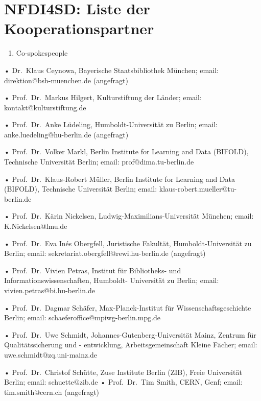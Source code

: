 \documentclass[
]{article}
\author{}
\date{}
\providecommand{\tightlist}{%
  \setlength{\itemsep}{0pt}\setlength{\parskip}{0pt}}
\begin{document}
\hypertarget{nfdi4sd-liste-der-kooperationspartner}{%
\section{NFDI4SD: Liste der
Kooperationspartner}\label{nfdi4sd-liste-der-kooperationspartner}}

\def\labelenumi{\arabic{enumi}.}
\tightlist
\begin{enumerate}
\def\labelenumi{\arabic{enumi}.}
\setcounter{enumi}{1}
\tightlist
\item
  Co-spokespeople
\end{enumerate}

• Dr.~Klaus Ceynowa, Bayerische Staatsbibliothek München; email:
direktion@bsb-muenchen.de (angefragt)

• Prof.~Dr.~Markus Hilgert, Kulturstiftung der Länder; email:
kontakt@kulturstiftung.de

• Prof.~Dr.~Anke Lüdeling, Humboldt-Universität zu Berlin; email:
anke.luedeling@hu-berlin.de (angefragt)

• Prof.~Dr.~Volker Markl, Berlin Institute for Learning and Data
(BIFOLD), Technische Universität Berlin; email: prof@dima.tu-berlin.de

• Prof.~Dr.~Klaus-Robert Müller, Berlin Institute for Learning and Data
(BIFOLD), Technische Universität Berlin; email:
klaus-robert.mueller@tu-berlin.de

• Prof.~Dr.~Kärin Nickelsen, Ludwig-Maximilians-Universität München;
email: K.Nickelsen@lmu.de

• Prof.~Dr.~Eva Inés Obergfell, Juristische Fakultät,
Humboldt-Universität zu Berlin; email:
sekretariat.obergfell@rewi.hu-berlin.de (angefragt)

• Prof.~Dr.~Vivien Petras, Institut für Bibliotheks- und
Informationswissenschaften, Humboldt- Universität zu Berlin; email:
vivien.petras@bi.hu-berlin.de

• Prof.~Dr.~Dagmar Schäfer, Max-Planck-Institut für
Wissenschaftsgeschichte Berlin; email:
schaeferoffice@mpiwg-berlin.mpg.de

• Prof.~Dr.~Uwe Schmidt, Johannes-Gutenberg-Universität Mainz, Zentrum
für Qualitätssicherung und - entwicklung, Arbeitsgemeinschaft Kleine
Fächer; email: uwe.schmidt@zq.uni-mainz.de

• Prof.~Dr.~Christof Schütte, Zuse Institute Berlin (ZIB), Freie
Universität Berlin; email: schuette@zib.de • Prof.~Dr.~Tim Smith, CERN,
Genf; email: tim.smith@cern.ch (angefragt)
\end{document}
